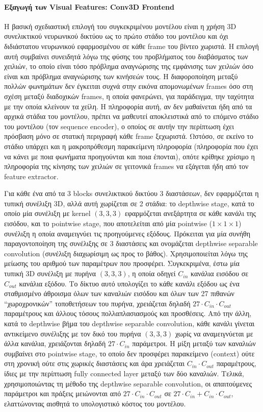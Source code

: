 \paragraph{Εξαγωγή των Visual Features: Conv3D Frontend}

Η βασική σχεδιαστική επιλογή του συγκεκριμένου μοντέλου είναι η χρήση 3D συνελικτικού νευρωνικού δικτύου ως το πρώτο στάδιο του μοντέλου και όχι διδιάστατου νευρωνικού εφαρμοσμένου σε κάθε frame του βίντεο χωριστά. Η επιλογή αυτή συμβαίνει συνειδητά λόγω της φύσης του προβλήματος του διαβάσματος των χειλιών, το οποίο είναι τόσο πρόβλημα αναγνώρισης της εμφάνισης των χειλιών όσο είναι και πρόβλημα αναγνώρισης των κινήσεών τους. Η διαφοροποίηση μεταξύ πολλών φωνημάτων δεν έγκειται συχνά στην εικόνα απομονωμένων frames όσο στη σχέση μεταξύ διαδοχικών frames, η οποία φανερώνει, για παράδειγμα, την ταχύτητα με την οποία κλείνουν τα χείλη. Η πληροφορία αυτή, αν δεν μαθαίνεται ήδη από τα αρχικά στάδια του μοντέλου, πρέπει να μαθευτεί αποκλειστικά από το επόμενο στάδιο του μοντέλου (τον sequence encoder), ο οποίος σε αυτήν την περίπτωση έχει πρόσβαση μόνο σε στατική περιγραφή κάθε frame ξεχωριστά. Ωστόσο, σε εκείνο το στάδιο υπάρχει και η μακροπρόθεσμη παρακείμενη πληροφορία (πληροφορία που έχει να κάνει με ποια φωνήματα προηγούνται και ποια έπονται), οπότε κρίθηκε χρίσιμο η πληροφορία της κίνησης των χειλιών σε γειτονικά frames να εξάγεται ήδη από τον feature extractor.

Για κάθε ένα από τα 3 blocks συνελικτικού δικτύου 3 διαστάσεων, δεν εφαρμόζεται η τυπική συνέλιξη 3D, αλλά αυτή χωρίζεται σε 2 στάδια: το depthwise stage, κατά το οποίο μία συνέλιξη με kernel $(3, 3, 3)$ εφαρμόζεται ανεξάρτητα σε κάθε κανάλι της εισόδου, και το pointwise stage, που αποτελείται από μία pointwise ($1 \times 1 \times 1$) συνέλιξη η οποία αναμειγνύει τις προηγούμενες εξόδους. Πρόκειται για μία συνήθη παραγοντοποίηση της συνέλιξης σε 3 διαστάσεις και ονομάζεται depthwise separable convolution (συνέλιξη διαχωρίσιμη ως προς το βάθος). Χρησιμοποιείται λόγω της μείωσης του αριθμού των παραμέτρων που προσφέρει. Συγκεκριμένα, έστω μία τυπική 3D συνέλιξη με πυρήνα $(3, 3, 3)$, η οποία οδηγεί $C_{in}$ κανάλια εισόδου σε $C_{out}$ κανάλια εξόδου. Το δίκτυο αυτό υπολογίζει το κάθε κανάλι εξόδου ως ένα σταθμισμένο άθροισμα όλων των καναλιών εισόδου και όλων των 27 πιθανών ``χωροχρονικών'' τοποθετήσεων του πυρήνα, χρειάζεται δηλαδή $27 \cdot C_{in} \cdot C_{out}$  παραμέτρους και άλλους τόσους πολλαπλασιασμούς και προσθέσεις. Από την άλλη, κατά το depthwise βήμα του depthwise separable convolution, κάθε κανάλι γίνεται αντικείμενο συνέλιξης με τον δικό του πυρήνα $(3, 3, 3)$ χωρίς να αναμειγνύεται με άλλα κανάλια, χρειάζονται δηλαδή $27 \cdot C_{in}$ παράμετροι. Η μίξη μεταξύ των καναλιών συμβαίνει στο pointwise stage, το οποίο δεν προσφέρει παρακείμενο (context) ούτε στη χρονική ούτε στις χωρικές διαστάσεις και άρα χρειάζεται $C_{in} \cdot C_{out}$ παραμέτρους, ίδιες με την περίπτωση fully connected layer μεταξύ των δύο καναλιών. Τελικά, χρησιμοποιώντας τη μέθοδο της depthwise separable convolution, οι απαιτούμενες παράμετροι και πράξεις μειώνονται από $27 \cdot C_{in} \cdot C_{out}$ σε $27 \cdot C_{in} + C_{in} \cdot C_{out}$, ελαττώνοντας αισθητά το υπολογιστικό κόστος του μοντέλου.

